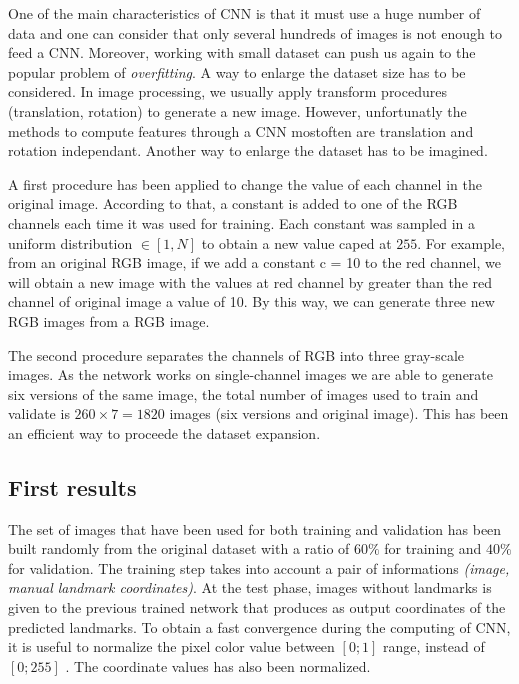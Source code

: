 \documentclass[10pt]{article}
\begin{document}
One of the main characteristics of CNN is that it must use a huge number of data 
and one can consider that only several hundreds of images is
not enough to feed a CNN. Moreover, working with small dataset can push
us again to the popular problem of \textit{overfitting}. A way to enlarge the dataset size has to be considered. In image processing, we usually apply
transform procedures (translation, rotation) to generate a new image. 
However, unfortunatly the methods to compute features through a CNN
mostoften are translation and rotation independant. Another way to
enlarge the dataset has to be imagined.


A first procedure has been applied to change the value of each
channel in the original image. According to that, a constant is
added to one of the RGB channels each time it was used for training.
Each constant was sampled in a uniform distribution $\in [1,N]$ to obtain
a new value caped at $255$. For example, from
an original RGB image, if we add a constant c = 10 to the
red channel, we will obtain a new image with the values at
red channel by greater than the red channel of original image
a value of 10. By this way, we can generate three new RGB
images from a RGB image.

The second procedure separates the channels of RGB into
three gray-scale images. As the network works on single-channel images
we are able to  generate six versions of the same image, the total number of
images used to train and validate is $260 \times 7 = 1820$ images
(six versions and original image). This has been an efficient way to
proceede the dataset expansion. 


\subsection{First results}
\label{sectrain1}
The set of images that have been used for both training and validation
has been built randomly from the original dataset with a ratio of
$60\%$ for training and $40\%$ for  validation. The training step
takes into account a pair of informations \textit{(image, manual
  landmark coordinates)}. At the test phase, images without landmarks
is given to the previous trained network that produces as output
coordinates of the predicted landmarks. To obtain a fast convergence
during the computing of CNN, it is useful to normalize the pixel
color value between $[0; 1]$ range, instead of $[0; 255]$  \cite{lecun2012efficient}. The
coordinate values has also been normalized.
\end{document}
